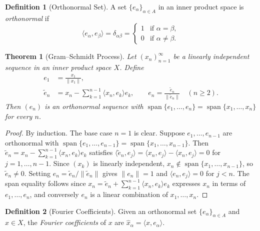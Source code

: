 \documentclass[11pt,a4paper]{article}
\theoremstyle{definition}
\newtheorem{definition}{Definition}[section]
\theoremstyle{plain}
\newtheorem{theorem}{Theorem}[section]
\theoremstyle{remark}
\DeclareMathOperator{\spn}{span}
\begin{document}
\begin{definition}[Orthonormal Set]\label{def:orthonormal}
A set $\{e_\alpha\}_{\alpha \in A}$ in an inner product space is
\emph{orthonormal} if
\[
    \langle e_\alpha, e_\beta \rangle = \delta_{\alpha\beta}
    = \begin{cases} 1 & \text{if } \alpha = \beta, \\ 0 & \text{if } \alpha \neq \beta. \end{cases}
\]
\end{definition}

\begin{theorem}[Gram--Schmidt Process]\label{thm:gram-schmidt}
Let $(x_n)_{n=1}^\infty$ be a linearly independent sequence in an inner
product space $X$. Define
\begin{align*}
    e_1 &= \frac{x_1}{\|x_1\|}, \\
    \tilde{e}_n &= x_n - \sum_{k=1}^{n-1} \langle x_n, e_k \rangle e_k,
    \qquad e_n = \frac{\tilde{e}_n}{\|\tilde{e}_n\|}
    \quad (n \geq 2).
\end{align*}
Then $(e_n)$ is an orthonormal sequence with
$\spn\{e_1, \ldots, e_n\} = \spn\{x_1, \ldots, x_n\}$ for every $n$.
\end{theorem}

\begin{proof}
By induction. The base case $n = 1$ is clear. Suppose $e_1, \ldots, e_{n-1}$
are orthonormal with $\spn\{e_1, \ldots, e_{n-1}\} = \spn\{x_1, \ldots, x_{n-1}\}$.
Then $\tilde{e}_n = x_n - \sum_{k=1}^{n-1} \langle x_n, e_k \rangle e_k$
satisfies $\langle \tilde{e}_n, e_j \rangle = \langle x_n, e_j \rangle
- \langle x_n, e_j \rangle = 0$ for $j = 1, \ldots, n-1$.
Since $(x_k)$ is linearly independent, $x_n \notin \spn\{x_1, \ldots, x_{n-1}\}$,
so $\tilde{e}_n \neq 0$. Setting $e_n = \tilde{e}_n / \|\tilde{e}_n\|$ gives
$\|e_n\| = 1$ and $\langle e_n, e_j \rangle = 0$ for $j < n$.
The span equality follows since $x_n = \tilde{e}_n + \sum_{k=1}^{n-1}
\langle x_n, e_k \rangle e_k$ expresses $x_n$ in terms of $e_1, \ldots, e_n$,
and conversely $e_n$ is a linear combination of $x_1, \ldots, x_n$.
\end{proof}

\begin{definition}[Fourier Coefficients]\label{def:fourier}
Given an orthonormal set $\{e_\alpha\}_{\alpha \in A}$ and $x \in X$, the
\emph{Fourier coefficients} of $x$ are $\hat{x}_\alpha = \langle x, e_\alpha \rangle$.
\end{definition}
\end{document}
